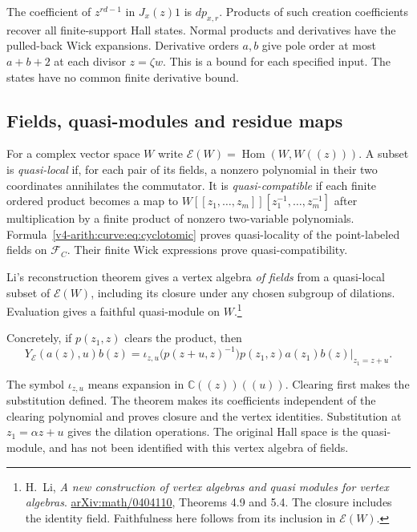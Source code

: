 The coefficient of $z^{rd-1}$ in $J_x(z)1$ is $dp_{x,r}$.
Products of such creation coefficients recover all finite-support
Hall states. Normal products and derivatives have the pulled-back
Wick expansions. Derivative orders $a,b$ give pole order at most
$a+b+2$ at each divisor $z=\zeta w$. This is a bound for each
specified input. The states have no common finite derivative bound.

\subsection{Fields, quasi-modules and residue maps}

For a complex vector space $W$ write
$\mathcal E(W)=\operatorname{Hom}(W,W((z)))$.
A subset is \emph{quasi-local} if, for each pair of its fields,
a nonzero polynomial in their two coordinates annihilates the
commutator. It is \emph{quasi-compatible} if each finite ordered
product becomes a map to
$W[[z_1,\ldots,z_m]][z_1^{-1},\ldots,z_m^{-1}]$
after multiplication by a finite product of nonzero two-variable
polynomials. Formula~\eqref{v4-arith:curve:eq:cyclotomic} proves
quasi-locality of the point-labeled fields on $\mathcal F_C$.
Their finite Wick expressions prove quasi-compatibility.

Li's reconstruction theorem gives a vertex algebra \emph{of fields}
from a quasi-local subset of $\mathcal E(W)$, including its closure
under any chosen subgroup of dilations. Evaluation gives a faithful
quasi-module on $W$.\footnote{H.~Li, \emph{A new construction of
vertex algebras and quasi modules for vertex algebras}.
\href{https://arxiv.org/abs/math/0404110}{arXiv:math/0404110},
Theorems 4.9 and 5.4. The closure includes the identity field.
Faithfulness here follows from its inclusion in $\mathcal E(W)$.}

Concretely, if $p(z_1,z)$ clears the product, then
\begin{equation}\label{v4-arith:curve:eq:field-product}
 Y_{\mathcal E}(a(z),u)b(z)
 =\iota_{z,u}\bigl(p(z+u,z)^{-1}\bigr)
   \left.p(z_1,z)a(z_1)b(z)\right|_{z_1=z+u}.
\end{equation}

The symbol $\iota_{z,u}$ means expansion in
$\mathbb C((z))((u))$. Clearing first makes the substitution
defined. The theorem makes its coefficients independent of the
clearing polynomial and proves closure and the vertex identities.
Substitution at $z_1=\alpha z+u$ gives the dilation operations.
The original Hall space is the quasi-module, and has not been
identified with this vertex algebra of fields.

